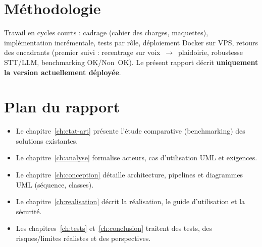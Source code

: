 \section{Méthodologie}

Travail en cycles courts : cadrage (cahier des charges, maquettes), implémentation incrémentale, tests par rôle, déploiement Docker sur VPS, retours des encadrants (premier suivi : recentrage sur voix~$\rightarrow$~plaidoirie, robustesse STT/LLM, benchmarking OK/Non~OK). Le présent rapport décrit \textbf{uniquement la version actuellement déployée}.

\section{Plan du rapport}

\begin{itemize}[leftmargin=1.4em]
  \item Le chapitre~\ref{ch:etat-art} présente l'étude comparative (benchmarking) des solutions existantes.
  \item Le chapitre~\ref{ch:analyse} formalise acteurs, cas d'utilisation UML et exigences.
  \item Le chapitre~\ref{ch:conception} détaille architecture, pipelines et diagrammes UML (séquence, classes).
  \item Le chapitre~\ref{ch:realisation} décrit la réalisation, le guide d'utilisation et la sécurité.
  \item Les chapitres~\ref{ch:tests} et~\ref{ch:conclusion} traitent des tests, des risques/limites réalistes et des perspectives.
\end{itemize}
